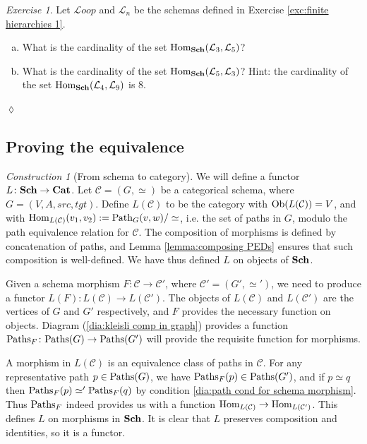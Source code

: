 \documentclass{book}
\def\tn{\textnormal}
\def\mc{\mathcal}
\def\Hom{\tn{Hom}}
\def\Path{\tn{Path}}
\def\Paths{\tn{Paths}}
\def\Ob{\tn{Ob}}
\def\to{\rightarrow}
\def\taking{\colon}
\def\Cat{{\bf Cat}}
\def\mcC{\mc{C}}
\def\mcL{\mc{L}}
\def\Loop{{\mcL oop}}
\theoremstyle{remark}
\newtheorem{construction}[subsubsection]{Construction}
\newtheorem{exc}[subsubsection]{Exercise}
\newenvironment{exercise}{\begin{exc}}{\hspace*{\fill}$\lozenge$\end{exc}}
\theoremstyle{definition}
\def\Sch{{\bf Sch}}
\def\sexc{\begin{enumerate}[a.)]\setlength{\itemsep}{.1cm}\setlength{\parskip}{.1cm}\item}
\def\next{\item}
\def\endsexc{\end{enumerate}}
\begin{document}
\begin{exercise}
Let $\Loop$ and $\mcL_n$ be the schemas defined in Exercise \ref{exc:finite hierarchies 1}.
\sexc What is the cardinality of the set $\Hom_\Sch(\mcL_3,\mcL_5)$?
\next What is the cardinality of the set $\Hom_\Sch(\mcL_5,\mcL_3)$? Hint: the cardinality of the set $\Hom_\Sch(\mcL_4,\mcL_9)$ is 8.
\endsexc
\end{exercise}


\subsection{Proving the equivalence}\label{sec:proof of cat=sch}

\begin{construction}[From schema to category]

We will define a functor $L\taking\Sch\to\Cat$\index{a functor!$\Sch\to\Cat$}. Let $\mcC=(G,\simeq)$ be a categorical schema, where $G=(V,A,src,tgt)$. Define $L(\mcC)$ to be the category with $\Ob(L(\mcC))=V$, and with $\Hom_{L(\mcC)}(v_1,v_2):=\Path_G(v,w)/\simeq$, i.e. the set of paths in $G$, modulo the path equivalence relation for $\mcC$. The composition of morphisms is defined by concatenation of paths, and Lemma \ref{lemma:composing PEDs} ensures that such composition is well-defined. We have thus defined $L$ on objects of $\Sch$.

Given a schema morphism $F\taking\mcC\to\mcC'$, where $\mcC'=(G',\simeq')$, we need to produce a functor $L(F)\taking L(\mcC)\to L(\mcC')$. The objects of $L(\mcC)$ and $L(\mcC')$ are the vertices of $G$ and $G'$ respectively, and $F$ provides the necessary function on objects. Diagram (\ref{dia:kleisli comp in graph}) provides a function $\Paths_F\taking\Paths(G)\to\Paths(G')$ will provide the requisite function for morphisms. 

A morphism in $L(\mcC)$ is an equivalence class of paths in $\mcC$. For any representative path $p\in\Paths(G)$, we have $\Paths_F(p)\in\Paths(G')$, and if $p\simeq q$ then $\Paths_F(p)\simeq'\Paths_F(q)$ by condition \ref{dia:path cond for schema morphism}. Thus $\Paths_F$ indeed provides us with a function $\Hom_{L(\mcC)}\to\Hom_{L(\mcC')}$. This defines $L$ on morphisms in $\Sch$. It is clear that $L$ preserves composition and identities, so it is a functor.

\end{construction}
\end{document}

